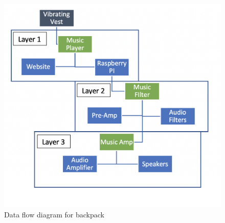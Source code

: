 \begin{figure}[h!]
	\centering
 	\includegraphics[width=\textwidth]{images/data_flow}
 \caption{Data flow diagram for backpack}
\end{figure}
